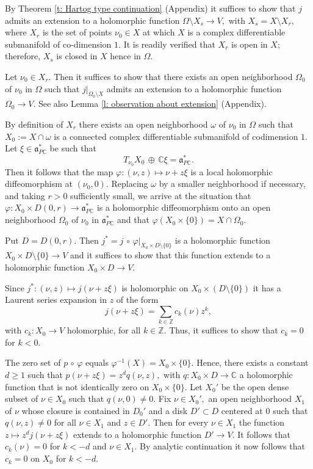 \documentclass[12pt,a4paper]{article}
\def\msy#1{{\mathbb #1}}
\def\C{{\msy C}}
\def\Z{{\msy Z}}
\def\gf{\varphi}
\def\got#1{\mathfrak #1}
\def\fa{{\got a}}
\def\to{\rightarrow}
\def\after{\,{\scriptstyle\circ}\,}
\def\iC{{\scriptscriptstyle \C}}
\numberwithin{Thm}{section}
\numberwithin{equation}{section}
\def\faPdc{{\fa_{P\iC}^*}}
\numberwithin{equation}{section}
\def\faPdc{\fa_{P\iC}^*}
\begin{document}
By Theorem \ref{t: Hartog type continuation} (Appendix) it suffices to show that
$j$ admits an extension to a holomorphic function $\Omega \setminus X_s \to V,$ 
with $X_s = X \setminus X_r,$ where $X_r$ is the set of points $\nu_0 \in X$ at which
$X$ is a complex differentiable submanifold of co-dimension $1.$  It is readily verified
that $X_r $ is open in $X;$ therefore, $X_s$ is closed in $X$ hence in $\Omega.$ 

Let $\nu_0 \in X_r.$ Then it suffices to show that there exists an open neighborhood  $\Omega_0$
of $\nu_0$ in $\Omega$ such that $j|_{\Omega_0 \setminus X}$ admits an extension to a holomorphic
function $\Omega _0 \to V.$ See also Lemma \ref{l: observation about extension} (Appendix).

By definition of $X_r$ there exists an open neighborhood $\omega$ of $\nu_0$ in $\Omega$ 
such that $X_0:= X\cap \omega$ is a connected complex differentiable submanifold of codimension $1.$ 
Let $\xi \in \faPdc$ be such that 
$$
T_{\nu_0} X_0 \,\oplus\,  \C \xi = \faPdc.
$$ 
Then it follows that the 
map $\gf: (\nu , z)\mapsto  \nu + z \xi$ is a local holomorphic diffeomorphism at $(\nu_0, 0).$ Replacing $\omega$ by a smaller neighborhood if necessary, and taking $r >0$ sufficiently small,  we arrive at the situation that $\gf: X_0 \times D(0,r) \to \faPdc$ is a holomorphic diffeomorphism onto an open neighborhood $\Omega_0$ of $\nu_0$ in $\faPdc$ and that $\gf(X_0 \times \{0\}) = X \cap \Omega_0.$ 

Put $D = D(0, r).$ Then $j^* = j\after \gf|_{X_0 \times D\setminus \{0\}}$ is a holomorphic function $X_0 \times D\setminus \{0\} \to V$ and it suffices to show that this function extends to a 
holomorphic function $X_0 \times D \to V.$ 

Since $j^*: (\nu, z) \mapsto j(\nu + z\xi)$ is holomorphic on $X_0 \times (D\setminus \{0\})$ 
it has a Laurent series expansion in $z$ of the form
$$ 
j(\nu + z\xi) = \sum_{k\in \Z} c_k(\nu) z^k,
$$ 
with $c_k: X_0 \to V$ holomorphic, for all $k \in \Z.$ 
 Thus, it suffices to show that $c_k = 0 $ for $k < 0.$ 

The zero set of $p\after \gf$ equals $\gf^{-1}(X) = X_0 \times \{0\}. $ Hence, 
there exists a constant $d\geq 1$ such that  
$p(\nu + z\xi) = z^d q(\nu, z),$ with $q: X_0 \times D \to \C$ a holomorphic function 
that is not identically zero on $X_0 \times \{0\}.$ Let $X_0'$ be the open dense subset of 
$\nu \in X_0$ such that $q(\nu, 0) \neq 0.$ Fix $\nu \in X_0',$ an open neighborhood
$X_1$ of $\nu$ whose closure is contained in $D_0'$ and a disk $D' \subset D$ centered at $0$ such that $q(\nu, z) \neq 0$ for all $\nu \in X_1$ and $z \in D'.$  
Then for every $\nu \in X_1$ the function 
$z \mapsto z^d j(\nu + z \xi)$ extends to a holomorphic function $D' \to V. $ It follows that 
 $c_k(\nu) = 0$ for $k < - d$ and $\nu \in X_1.$ By analytic continuation it now follows that $c_k = 0$ on $X_0$ for $k < - d.$ 
 
\end{document}
